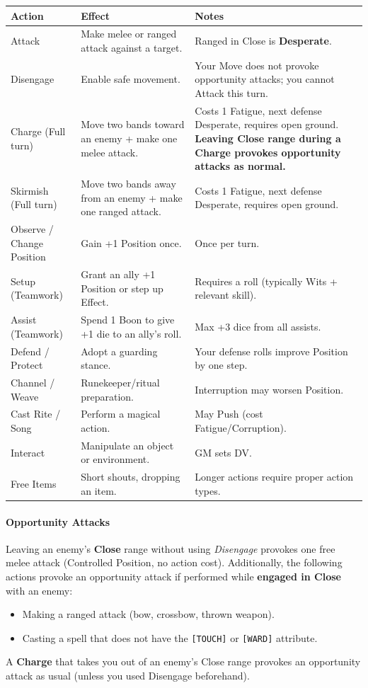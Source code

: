 \begin{tabular}{|p{2.8cm}|p{6cm}|p{3.5cm}|}
\hline
\textbf{Action} & \textbf{Effect} & \textbf{Notes} \\
\hline
Attack & Make melee or ranged attack against a target. & Ranged in Close is \textbf{Desperate}. \\
\hline
Disengage & Enable safe movement. & Your Move does not provoke opportunity attacks; you cannot Attack this turn. \\
\hline
Charge (Full turn) & Move two bands toward an enemy + make one melee attack. & Costs 1 Fatigue, next defense Desperate, requires open ground. \textbf{Leaving Close range during a Charge provokes opportunity attacks as normal.} \\
\hline
Skirmish (Full turn) & Move two bands away from an enemy + make one ranged attack. & Costs 1 Fatigue, next defense Desperate, requires open ground. \\
\hline
Observe / Change Position & Gain +1 Position once. & Once per turn. \\
\hline
Setup (Teamwork) & Grant an ally +1 Position or step up Effect. & Requires a roll (typically Wits + relevant skill). \\
\hline
Assist (Teamwork) & Spend 1 Boon to give +1 die to an ally’s roll. & Max +3 dice from all assists. \\
\hline
Defend / Protect & Adopt a guarding stance. & Your defense rolls improve Position by one step. \\
\hline
Channel / Weave & Runekeeper/ritual preparation. & Interruption may worsen Position. \\
\hline
Cast Rite / Song & Perform a magical action. & May Push (cost Fatigue/Corruption). \\
\hline
Interact & Manipulate an object or environment. & GM sets DV. \\
\hline
Free Items & Short shouts, dropping an item. & Longer actions require proper action types. \\
\hline
\end{tabular}

\paragraph{Opportunity Attacks}
\label{sec:opportunity-attacks}
Leaving an enemy’s \textbf{Close} range without using \textit{Disengage} provokes one free melee attack (Controlled Position, no action cost). Additionally, the following actions provoke an opportunity attack if performed while \textbf{engaged in Close} with an enemy:
\begin{itemize}
  \item Making a ranged attack (bow, crossbow, thrown weapon).
  \item Casting a spell that does not have the \texttt{[TOUCH]} or \texttt{[WARD]} attribute.
\end{itemize}
A \textbf{Charge} that takes you out of an enemy’s Close range provokes an opportunity attack as usual (unless you used Disengage beforehand).

